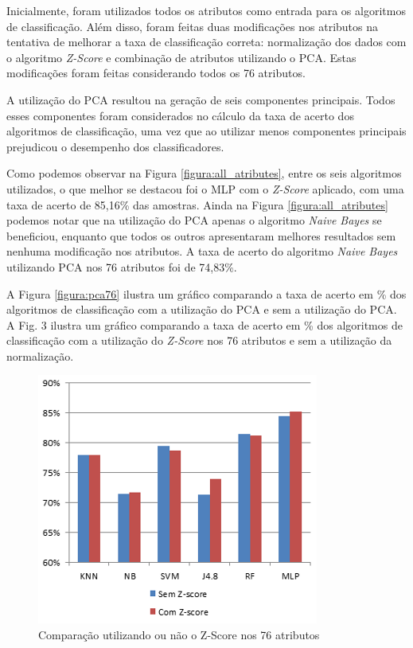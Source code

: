 \documentclass[conference]{IEEEtran}
\begin{document}
Inicialmente, foram utilizados todos os atributos como entrada para os algoritmos de classificação.
Além disso, foram feitas duas modificações nos atributos na tentativa de melhorar a taxa de classificação correta: normalização dos dados com o algoritmo \textit{Z-Score} e combinação de atributos utilizando o PCA. Estas modificações foram feitas considerando todos os 76 atributos.

A utilização do PCA resultou na geração de seis componentes principais. Todos esses componentes foram considerados no cálculo da taxa de acerto dos algoritmos de classificação, uma vez que ao utilizar menos componentes principais prejudicou o desempenho dos classificadores.

Como podemos observar na Figura \ref{figura:all_atributes}, entre os seis algoritmos utilizados, o que melhor se destacou foi o MLP com o \textit{Z-Score} aplicado, com uma taxa de acerto de 85,16\% das amostras. Ainda na Figura \ref{figura:all_atributes} podemos notar que na utilização do PCA apenas o algoritmo {\it Naive Bayes} se beneficiou, enquanto que todos os outros apresentaram melhores resultados sem nenhuma modificação nos atributos. A taxa de acerto do algoritmo {\it Naive Bayes} utilizando PCA nos 76 atributos foi de 74,83\%. 

A Figura \ref{figura:pca76} ilustra um gráfico comparando a taxa de acerto em \% dos algoritmos de classificação com a utilização do PCA e sem a utilização do PCA. A Fig. 3 ilustra um gráfico comparando a taxa de acerto em \% dos algoritmos de classificação com a utilização do \textit{Z-Score} nos 76 atributos e sem a utilização da normalização.

\begin{figure}
\centering
\includegraphics[scale=0.9]{z-score.png}
\caption{Comparação utilizando ou não o Z-Score nos 76 atributos}
\label{figura:z_score}
\end{figure}
\end{document}
